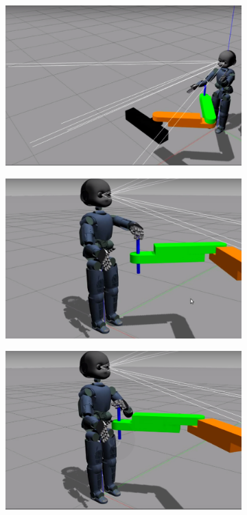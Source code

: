 \documentclass[12pt,a4paper]{report}
\begin{document}
\begin{figure}[!ht]
		\centering
		\begin{subfigure}[b]{0.5\textwidth}
			\includegraphics[scale=0.299]{figures/icub1.jpg}
			\caption{  }
			\label{icub_mani1}
		\end{subfigure}
		\begin{subfigure}[b]{0.5\textwidth}
			\includegraphics[scale=0.3]{figures/icub2.jpg}
	    		\caption{  }
	    		\label{icub_mani2}
		\end{subfigure}
	    \begin{subfigure}[b]{0.5\textwidth}	
			\includegraphics[scale=0.295]{figures/icub3.jpg}

\end{subfigure}
\end{figure}
\end{document}
